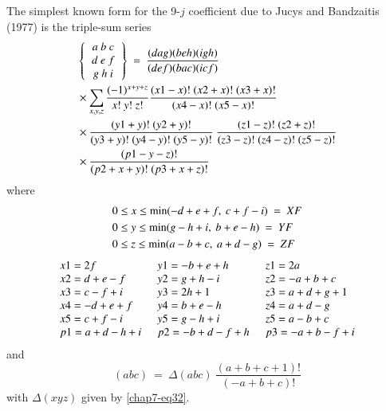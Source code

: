 The simplest known form for the 9-$j$ coefficient due to Jucys and Bandzaitis (1977) is the triple-sum series
\begin{equation}
\begin{split}
& \left\{
\begin{tabular}{c}
$a \ b \ c$\\   
$d \ e\ f$\\ 
$g \ h \ i$\\ 
\end{tabular} 
\right\} \
=\ \frac{(dag)(beh)(igh)}{(def)(bac)(icf)}\\
& \times \sum_{x,y,z} \frac{(-1)^{x+y+z}}{x!\ y!\ z!} \frac{(x1-x)!\ (x2+x)!\ (x3+x)!}
{(x4-x)!\ (x5-x)!}\\
& \times\frac{(y1+y)!\ (y2+y)!}{(y3+y)!\ (y4-y)!\ (y5-y)!} \ \frac{(z1-z)!\ (z2+z)!}{(z3-z)!\ (z4-z)!\ (z5-z)!}\\
& \times \frac{(p1-y-z)!}{(p2+x+y)!\ (p3+x+z)!} \label{chap7-eq54}
\end{split}
\end{equation}
where
\begin{equation}
\begin{split}
& 0 \leq x \leq {\rm min} (-d+e+f,\ c+f-i)\ =\ XF \\
& 0 \leq y \leq {\rm min} ( g-h+i,\ b+e-h)\ =\ YF \\
& 0 \leq z \leq {\rm min} ( a-b+c,\ a+d-g)\ =\ ZF \label{chap7-eq55}
\end{split}
\end{equation}
\begin{equation}
\begin{tabular}{lll}
$x1=2f$ &\ $y1=-b+e+h$ &\ $z1=2a$ \\
$x2=d+e-f$ &\ $y2=g+h-i$ &\ $z2=-a+b+c$ \\
$x3=c-f+i$ &\ $y3=2h+1$ &\ $z3=a+d+g+1$\\
$x4=-d+e+f$ &\ $y4=b+e-h$ &\ $z4=a+d-g$ \\
$x5=c+f-i$ &\ $y5=g-h+i$ &\ $z5=a-b+c$ \\
$p1=a+d-h+i$ &\ $p2=-b+d-f+h$ &\ $p3=-a+b-f+i$\label{chap7-eq56}
\end{tabular}
\end{equation}
and 
\begin{equation}
(abc)\ =\ \Delta(abc)\ \frac{(a+b+c+1)!}{(-a+b+ c)!}\label{chap7-eq57}
\end{equation}
with $\Delta(xyz)$ given by \eqref{chap7-eq32}.

